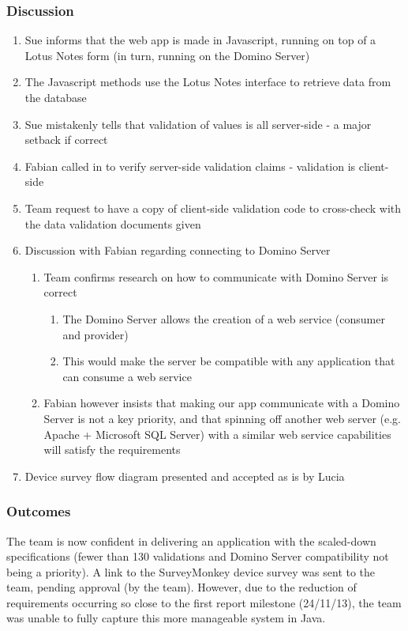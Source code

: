 \documentclass[12pt,a4paper,oneside,titlepage]{article}
\begin{document}
\subsubsection{Discussion}
\begin{enumerate}
	\item Sue informs that the web app is made in Javascript, running on top of a Lotus Notes form (in turn, running on the Domino Server) 
	\item The Javascript methods use the Lotus Notes interface to retrieve data from the database 
	\item Sue mistakenly tells that validation of values is all server-side - a major setback if correct 
	\item Fabian called in to verify server-side validation claims - validation is client-side 
	\item Team request to have a copy of client-side validation code to cross-check with the data validation documents given 
	\item Discussion with Fabian regarding connecting to Domino Server
	\begin{enumerate}
	\item Team confirms research on how to communicate with Domino Server is correct
	\begin{enumerate}
		\item The Domino Server allows the creation of a web service (consumer and provider) 
		\item This would make the server be compatible with any application that can consume a web service 
	\end{enumerate}
	\item Fabian however insists that making our app communicate with a Domino Server is not a key priority, and that spinning off another web server (e.g. Apache + Microsoft SQL Server) with a similar web service capabilities will satisfy the requirements
	\end{enumerate}
	\item Device survey flow diagram presented and accepted as is by Lucia
\end{enumerate}
\subsubsection{Outcomes}
The team is now confident in delivering an application with the scaled-down specifications (fewer than 130 validations and Domino Server compatibility not being a priority). A link to the SurveyMonkey device survey was sent to the team, pending approval (by the team). However, due to the reduction of requirements occurring so close to the first report milestone (24/11/13), the team was unable to fully capture this more manageable system in Java.
\end{document}
